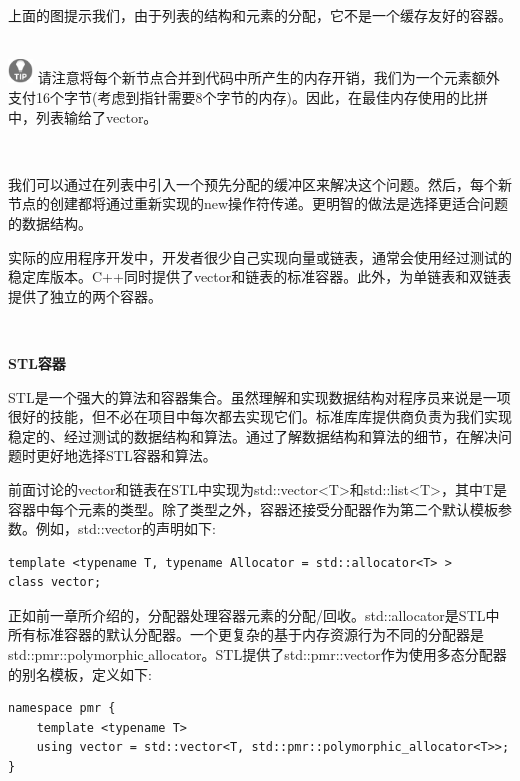 上面的图提示我们，由于列表的结构和元素的分配，它不是一个缓存友好的容器。 \par

\hspace*{\fill} \\ %
\includegraphics[width=0.05\textwidth]{images/tip}
请注意将每个新节点合并到代码中所产生的内存开销，我们为一个元素额外支付16个字节(考虑到指针需要8个字节的内存)。因此，在最佳内存使用的比拼中，列表输给了vector。 \par
\noindent\textbf{}\ \par

我们可以通过在列表中引入一个预先分配的缓冲区来解决这个问题。然后，每个新节点的创建都将通过重新实现的new操作符传递。更明智的做法是选择更适合问题的数据结构。 \par
实际的应用程序开发中，开发者很少自己实现向量或链表，通常会使用经过测试的稳定库版本。C++同时提供了vector和链表的标准容器。此外，为单链表和双链表提供了独立的两个容器。 \par

\noindent\textbf{}\ \par
\textbf{STL容器} \ \par
STL是一个强大的算法和容器集合。虽然理解和实现数据结构对程序员来说是一项很好的技能，但不必在项目中每次都去实现它们。标准库库提供商负责为我们实现稳定的、经过测试的数据结构和算法。通过了解数据结构和算法的细节，在解决问题时更好地选择STL容器和算法。 \par
前面讨论的vector和链表在STL中实现为std::vector<T>和std::list<T>，其中T是容器中每个元素的类型。除了类型之外，容器还接受分配器作为第二个默认模板参数。例如，std::vector的声明如下: \par

\begin{lstlisting}[caption={}]
template <typename T, typename Allocator = std::allocator<T> >
class vector;
\end{lstlisting}

正如前一章所介绍的，分配器处理容器元素的分配/回收。std::allocator是STL中所有标准容器的默认分配器。一个更复杂的基于内存资源行为不同的分配器是std::pmr::polymorphic\underline{ }allocator。STL提供了std::pmr::vector作为使用多态分配器的别名模板，定义如下: \par

\begin{lstlisting}[caption={}]
namespace pmr {
	template <typename T>
	using vector = std::vector<T, std::pmr::polymorphic_allocator<T>>;
}
\end{lstlisting}

